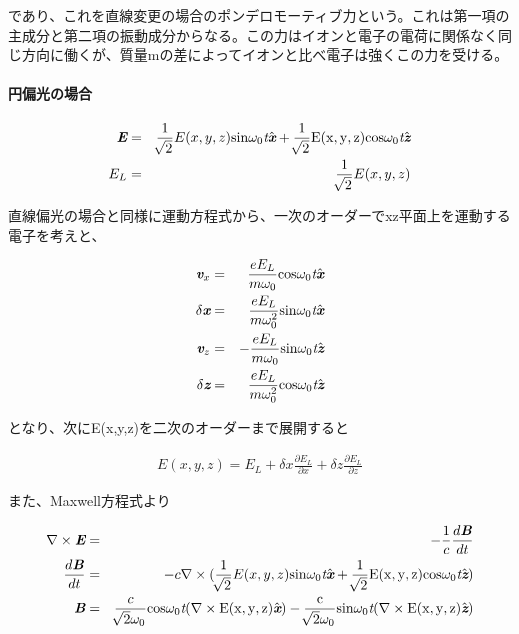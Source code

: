 \documentclass[a4paper,11pt,titlepage]{jarticle}
\numberwithin{equation}{section} %
\begin{document}
  であり、これを直線変更の場合のポンデロモーティブ力という。これは第一項の主成分と第二項の振動成分からなる。この力はイオンと電子の電荷に関係なく同じ方向に働くが、質量mの差によってイオンと比べ電子は強くこの力を受ける。
  
  \paragraph*{円偏光の場合}
  
  \begin{eqnarray}
    \label{eq:2-4-4}
    \textit{\textbf{E}} &=& \frac{1}{\sqrt[]{2}} E(x,y,z) \rm{sin} \omega _0 \textit{t} \hat{\textit{\textbf{x}}} + \frac{1}{\sqrt[]{2}} E(x,y,z) \rm{cos} \omega _0 \textit{t} \hat{\textit{\textbf{z}}}\\
    E_L &=& \frac{1}{\sqrt[]{2}} E(x,y,z) 
  \end{eqnarray}
  
  直線偏光の場合と同様に運動方程式から、一次のオーダーでxz平面上を運動する電子を考えと、
  
  \begin{eqnarray}
    \textit{\textbf{v}}_x &=& \frac{e E_L}{m \omega _0} \rm{cos} \omega _0 \textit{t} \hat{\textit{\textbf{x}}}\\
    \delta \textit{\textbf{x}} &=& \frac{e E_L}{m \omega _0^2} \rm{sin} \omega _0 \textit{t} \hat{\textit{\textbf{x}}}\\
    \textit{\textbf{v}}_z &=& - \frac{e E_L}{m \omega _0} \rm{sin} \omega _0 \textit{t} \hat{\textit{\textbf{z}}}\\
    \delta \textit{\textbf{z}} &=& \frac{e E_L}{m \omega _0^2} \rm{cos} \omega _0 \textit{t} \hat{\textit{\textbf{z}}}
  \end{eqnarray}
  
  となり、次にE(x,y,z)を二次のオーダーまで展開すると
  
  \begin{eqnarray}
    E(x,y,z) = E_L + \delta x \frac{\partial E_L}{\partial x} + \delta z \frac{\partial E_L}{\partial z}
  \end{eqnarray}
  
  また、Maxwell方程式より
  
  \begin{eqnarray}
    \nabla \times \textit{\textbf{E}} &=& - \frac{1}{c} \frac{d \textit{\textbf{B}}}{dt}\\
    \frac{d \textit{\textbf{B}}}{dt} &=& -c \nabla \times (\frac{1}{\sqrt[]{2}} E(x,y,z) \rm{sin} \omega _0 \textit{t} \hat{\textit{\textbf{x}}} + \frac{1}{\sqrt[]{2}} E(x,y,z) \rm{cos} \omega _0 \textit{t} \hat{\textit{\textbf{z}}})\\
    \textit{\textbf{B}} &=& \frac{c}{\sqrt[]{2} \omega _0} \rm{cos}\omega _0 \textit{t} \lparen \nabla \times E(x,y,z) \hat{\textit{\textbf{x}}} \rparen - \frac{c}{\sqrt[]{2} \omega _0}\rm{sin}\omega _0 \textit{t} \lparen \nabla \times E(x,y,z) \hat{\textit{\textbf{z}}} \rparen 
  \end{eqnarray}
  
\end{document}

